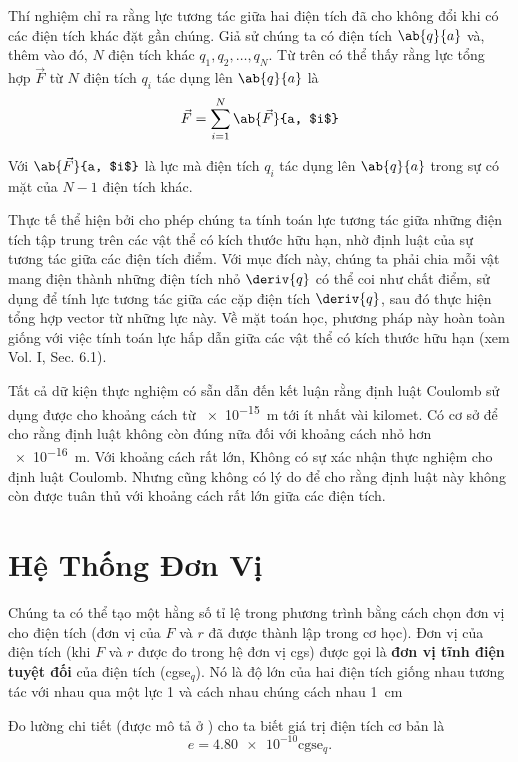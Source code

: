 Thí nghiệm chỉ ra rằng lực tương tác giữa hai điện tích đã cho không đổi khi có các điện tích khác đặt gần chúng. Giả sử chúng ta có điện tích $\ab{q}{a}$ và, thêm vào đó, $N$ điện tích khác $q_1, q_2,\ldots, q_N$. Từ trên có thể thấy rằng lực tổng hợp $\vec{F}$ từ $N$ điện tích $q_i$ tác dụng lên $\ab{q}{a}$ là
\begin{equation}\label{eq:1_5}
	\vec{F} = \sum_{i=1}^N \ab{\vec{F}}{a, $i$}
\end{equation}

\noindent
Với $\ab{\vec{F}}{a, $i$}$ là lực mà điện tích $q_i$ tác dụng lên $\ab{q}{a}$ trong sự có mặt của $N-1$ điện tích khác.

Thực tế thể hiện bởi  cho phép chúng ta tính toán lực tương tác giữa những điện tích tập trung trên các vật thể có kích thước hữu hạn, nhờ định luật của sự tương tác giữa các điện tích điểm. Với mục đích này, chúng ta phải chia mỗi vật mang điện thành những điện tích nhỏ $\deriv{q}$ có thể coi như chất điểm, sử dụng  để tính lực tương tác giữa các cặp điện tích $\deriv{q}$, sau đó thực hiện tổng hợp vector từ những lực này. Về mặt toán học, phương pháp này hoàn toàn giống với việc tính toán lực hấp dẫn giữa các vật thể có kích thước hữu hạn (xem Vol. I, Sec. 6.1).

Tất cả dữ kiện thực nghiệm có sẵn dẫn đến kết luận rằng định luật Coulomb sử dụng được cho khoảng cách từ \SI{e-15}{\metre} tới ít nhất vài kilomet. Có cơ sở để cho rằng định luật không còn đúng nữa đối với khoảng cách nhỏ hơn \SI{e-16}{\metre}. Với khoảng cách rất lớn, Không có sự xác nhận thực nghiệm cho định luật Coulomb. Nhưng cũng không có lý do để cho rằng định luật này không còn được tuân thủ với khoảng cách rất lớn giữa các điện tích.

\section{Hệ Thống Đơn Vị}\label{sec:1_3}

Chúng ta có thể tạo một hằng số tỉ lệ trong phương trình  bằng cách chọn đơn vị cho điện tích (đơn vị của $F$ và $r$ đã được thành lập trong cơ học). Đơn vị của điện tích (khi $F$ và $r$ được đo trong hệ đơn vị cgs) được gọi là \textbf{đơn vị tĩnh điện tuyệt đối} của điện tích (cgse$_q$). Nó là độ lớn của hai điện tích giống nhau tương tác với nhau qua một lực \SI{1}{\dyne} và cách nhau chúng cách nhau \SI{1}{\centi\metre}

Đo lường chi tiết (được mô tả ở ) cho ta biết giá trị điện tích cơ bản là
\begin{equation}\label{eq:1_6}
	e = \num{4.80e-10}\text{cgse$_q$}.
\end{equation}

